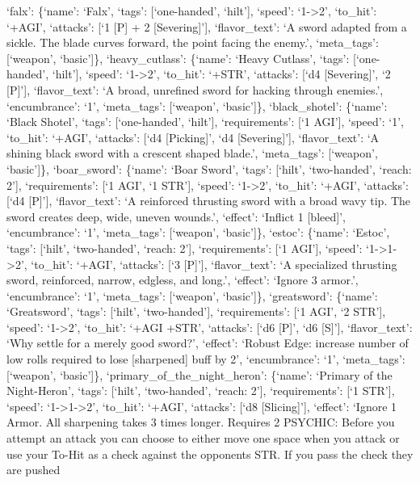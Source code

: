 \documentclass[
  letterpaper,
  DIV=11,
  numbers=noendperiod]{scrartcl}
\begin{document}
`falx': \{`name': `Falx', `tags': {[}`one-handed', `hilt'{]}, `speed':
`1-\textgreater2', `to\_hit': `+AGI', `attacks': {[}`1 {[}P{]} + 2
{[}Severing{]}'{]}, `flavor\_text': `A sword adapted from a sickle. The
blade curves forward, the point facing the enemy.', `meta\_tags':
{[}`weapon', `basic'{]}\}, `heavy\_cutlass': \{`name': `Heavy Cutlass',
`tags': {[}`one-handed', `hilt'{]}, `speed': `1-\textgreater2',
`to\_hit': `+STR', `attacks': {[}`d4 {[}Severing{]}', `2 {[}P{]}'{]},
`flavor\_text': `A broad, unrefined sword for hacking through enemies.',
`encumbrance': `1', `meta\_tags': {[}`weapon', `basic'{]}\},
`black\_shotel': \{`name': `Black Shotel', `tags': {[}`one-handed',
`hilt'{]}, `requirements': {[}`1 AGI'{]}, `speed': `1', `to\_hit':
`+AGI', `attacks': {[}`d4 {[}Picking{]}', `d4 {[}Severing{]}'{]},
`flavor\_text': `A shining black sword with a crescent shaped blade.',
`meta\_tags': {[}`weapon', `basic'{]}\}, `boar\_sword': \{`name': `Boar
Sword', `tags': {[}`hilt', `two-handed', `reach: 2'{]}, `requirements':
{[}`1 AGI', `1 STR'{]}, `speed': `1-\textgreater2', `to\_hit': `+AGI',
`attacks': {[}`d4 {[}P{]}'{]}, `flavor\_text': `A reinforced thrusting
sword with a broad wavy tip. The sword creates deep, wide, uneven
wounds.', `effect': `Inflict 1 {[}bleed{]}', `encumbrance': `1',
`meta\_tags': {[}`weapon', `basic'{]}\}, `estoc': \{`name': `Estoc',
`tags': {[}`hilt', `two-handed', `reach: 2'{]}, `requirements': {[}`1
AGI'{]}, `speed': `1-\textgreater1-\textgreater2', `to\_hit': `+AGI',
`attacks': {[}`3 {[}P{]}'{]}, `flavor\_text': `A specialized thrusting
sword, reinforced, narrow, edgless, and long.', `effect': `Ignore 3
armor.', `encumbrance': `1', `meta\_tags': {[}`weapon', `basic'{]}\},
`greatsword': \{`name': `Greatsword', `tags': {[}`hilt',
`two-handed'{]}, `requirements': {[}`1 AGI', `2 STR'{]}, `speed':
`1-\textgreater2', `to\_hit': `+AGI +STR', `attacks': {[}`d6 {[}P{]}',
`d6 {[}S{]}'{]}, `flavor\_text': `Why settle for a merely good sword?',
`effect': `Robust Edge: increase number of low rolls required to lose
{[}sharpened{]} buff by 2', `encumbrance': `1', `meta\_tags':
{[}`weapon', `basic'{]}\}, `primary\_of\_the\_night\_heron': \{`name':
`Primary of the Night-Heron', `tags': {[}`hilt', `two-handed', `reach:
2'{]}, `requirements': {[}`1 STR'{]}, `speed':
`1-\textgreater1-\textgreater2', `to\_hit': `+AGI', `attacks': {[}`d8
{[}Slicing{]}'{]}, `effect': `Ignore 1 Armor. All sharpening takes 3
times longer. Requires 2 PSYCHIC: Before you attempt an attack you can
choose to either move one space when you attack or use your To-Hit as a
check against the opponents STR. If you pass the check they are pushed
\end{document}
